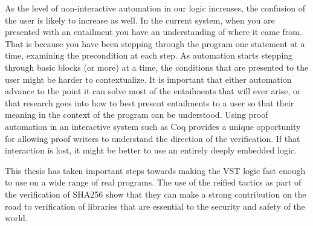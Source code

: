 \documentclass{puthesis}
\begin{document}
As the level of non-interactive
automation in our logic increases, the confusion of the user is likely
to increase as well. In the current system, when you are presented
with an entailment you have an understanding of where it came
from. That is because you have been stepping through the program one
statement at a time, examining the precondition at each step. As
automation starts stepping through basic blocks (or more) at a time,
the conditions that are presented to the user might be harder to
contextualize. It is important that either automation advance to the
point it can solve most of the entailments that will ever arise, or
that research goes into how to best present entailments to a user so
that their meaning in the context of the program can be
understood. Using proof automation in an interactive system such as
Coq provides a unique opportunity for allowing proof writers to
understand the direction of the verification. If that interaction is
lost, it might be better to use an entirely deeply embedded logic.

This thesis has taken important steps towards making the VST logic
fast enough to use on a wide range of real programs. The use of the
reified tactics as part of the verification of SHA256 show that they
can make a strong contribution on the road to verification of
libraries that are essential to the security and safety of the world.




\end{document}
